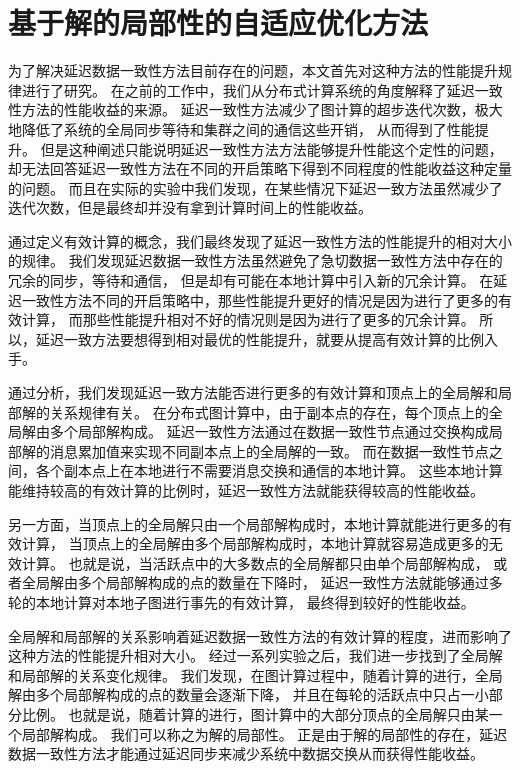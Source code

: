 \section{基于解的局部性的自适应优化方法}
为了解决延迟数据一致性方法目前存在的问题，本文首先对这种方法的性能提升规律进行了研究。
在之前的工作中，我们从分布式计算系统的角度解释了延迟一致性方法的性能收益的来源。
延迟一致性方法减少了图计算的超步迭代次数，极大地降低了系统的全局同步等待和集群之间的通信这些开销，
从而得到了性能提升。
但是这种阐述只能说明延迟一致性方法方法能够提升性能这个定性的问题，
却无法回答延迟一致性方法在不同的开启策略下得到不同程度的性能收益这种定量的问题。
而且在实际的实验中我们发现，在某些情况下延迟一致方法虽然减少了迭代次数，但是最终却并没有拿到计算时间上的性能收益。

通过定义有效计算的概念，我们最终发现了延迟一致性方法的性能提升的相对大小的规律。
我们发现延迟数据一致性方法虽然避免了急切数据一致性方法中存在的冗余的同步，等待和通信，
但是却有可能在本地计算中引入新的冗余计算。
在延迟一致性方法不同的开启策略中，那些性能提升更好的情况是因为进行了更多的有效计算，
而那些性能提升相对不好的情况则是因为进行了更多的冗余计算。
所以，延迟一致方法要想得到相对最优的性能提升，就要从提高有效计算的比例入手。

通过分析，我们发现延迟一致方法能否进行更多的有效计算和顶点上的全局解和局部解的关系规律有关。
在分布式图计算中，由于副本点的存在，每个顶点上的全局解由多个局部解构成。
延迟一致性方法通过在数据一致性节点通过交换构成局部解的消息累加值来实现不同副本点上的全局解的一致。
而在数据一致性节点之间，各个副本点上在本地进行不需要消息交换和通信的本地计算。
这些本地计算能维持较高的有效计算的比例时，延迟一致性方法就能获得较高的性能收益。

另一方面，当顶点上的全局解只由一个局部解构成时，本地计算就能进行更多的有效计算，
当顶点上的全局解由多个局部解构成时，本地计算就容易造成更多的无效计算。
也就是说，当活跃点中的大多数点的全局解都只由单个局部解构成，
或者全局解由多个局部解构成的点的数量在下降时，
延迟一致性方法就能够通过多轮的本地计算对本地子图进行事先的有效计算，
最终得到较好的性能收益。


全局解和局部解的关系影响着延迟数据一致性方法的有效计算的程度，进而影响了这种方法的性能提升相对大小。
经过一系列实验之后，我们进一步找到了全局解和局部解的关系变化规律。
我们发现，在图计算过程中，随着计算的进行，全局解由多个局部解构成的点的数量会逐渐下降，
并且在每轮的活跃点中只占一小部分比例。
也就是说，随着计算的进行，图计算中的大部分顶点的全局解只由某一个局部解构成。
我们可以称之为解的局部性。
正是由于解的局部性的存在，延迟数据一致性方法才能通过延迟同步来减少系统中数据交换从而获得性能收益。

